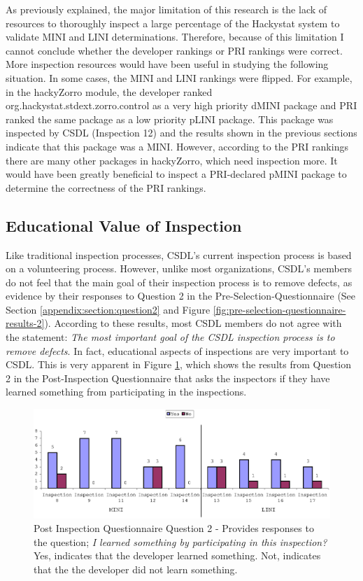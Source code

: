 As previously explained, the major limitation of this research is the lack
of resources to thoroughly inspect a large percentage of the Hackystat
system to validate MINI and LINI determinations. Therefore, because of this
limitation I cannot conclude whether the developer rankings or PRI rankings
were correct. More inspection resources would have been useful in studying
the following situation. In some cases, the MINI and LINI rankings were
flipped. For example, in the hackyZorro module, the developer ranked
org.hackystat.stdext.zorro.control as a very high priority dMINI package
and PRI ranked the same package as a low priority pLINI package. This
package was inspected by CSDL (Inspection 12) and the results shown in the
previous sections indicate that this package was a MINI. However, according
to the PRI rankings there are many other packages in hackyZorro, which need
inspection more. It would have been greatly beneficial to inspect a
PRI-declared pMINI package to determine the correctness of the PRI
rankings.



\subsection{Educational Value of Inspection}
Like traditional inspection processes, CSDL's current inspection process is
based on a volunteering process. However, unlike most organizations, CSDL's
members do not feel that the main goal of their inspection process is to
remove defects, as evidence by their responses to Question 2 in the
Pre-Selection-Questionnaire (See Section \ref{appendix:section:question2}
and Figure \ref{fig:pre-selection-questionnaire-results-2}). According to
these results, most CSDL members do not agree with the statement:
\textit{The most important goal of the CSDL inspection process is to remove
  defects}.  In fact, educational aspects of inspections are very important
to CSDL.  This is very apparent in Figure \ref{fig:post-inspection-2},
which shows the results from Question 2 in the Post-Inspection
Questionnaire that asks the inspectors if they have learned something from
participating in the inspections. 

\begin{figure}[!htb]
  \centering
  \includegraphics[width=1.0\textwidth]{figs/Results/post-inspection-2.eps}
  \caption[Post Inspection Questionnaire - Question 2]{Post Inspection
    Questionnaire Question 2 - Provides responses to the question;
    \textit{I learned something by participating in this inspection?} Yes,
    indicates that the developer learned something. Not, indicates that
    the the developer did not learn something.}
  \label{fig:post-inspection-2}
\end{figure}

